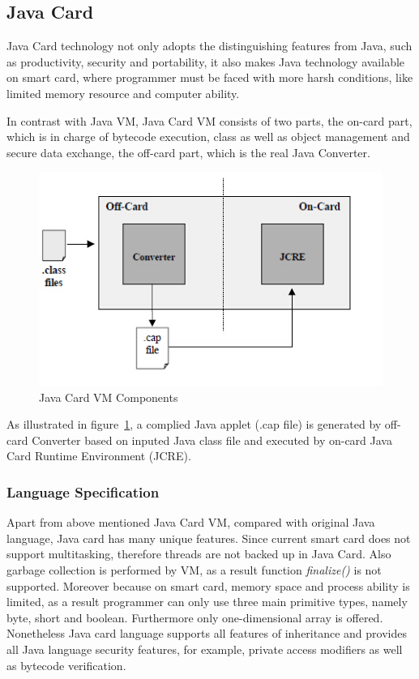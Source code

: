 \documentclass[]{llncs}
\begin{document}
\subsection{Java Card}
Java Card technology not only adopts the distinguishing features from Java, such as productivity, security and portability\cite{jcadg}, it also makes Java technology available on smart card, where programmer must be faced with more harsh conditions, like limited memory resource and computer ability.

In contrast with Java VM, Java Card VM consists of two parts, the on-card part, which is in charge of bytecode execution, class as well as object management and secure data exchange, the off-card part, which is the real Java Converter.
 \begin{figure}[!htbp]
	\centering
	\includegraphics[width=1\textwidth]{jcvm.jpg}
		\caption[ ]{Java Card VM Components\cite{jcadg}}
	\label{fig:jcvm}
\end{figure}
As illustrated in figure~\ref{fig:jcvm}, a complied Java applet (.cap file) is generated by off-card Converter based on inputed Java class file and executed by on-card Java Card Runtime Environment (JCRE). 

\subsubsection{Language Specification}
Apart from above mentioned Java Card VM, compared with original Java language, Java card has many unique features.
Since current smart card does not support multitasking, therefore threads are not backed up in Java Card. Also garbage collection  is performed by VM, as a result function \emph{finalize()} is not supported. Moreover because on smart card, memory space and process ability is limited, as a result programmer can only use three main primitive types, namely byte, short and boolean. Furthermore only one-dimensional array is offered. Nonetheless Java card language supports all features of inheritance and provides all Java language security features, for example, private access modifiers as well as bytecode verification\cite{jcadg}.
\end{document}
